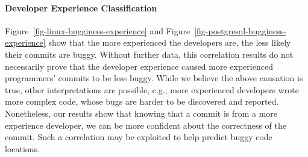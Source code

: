 


\paragraph{Developer Experience Classification}

Figure~\ref{fig-linux-bugginess-experience} and Figure~\ref{fig-postgresql-bugginess-experience} 
show that the more experienced the developers are, the less likely their commits are buggy.
Without further data, this correlation results do not necessarily prove that the developer experience caused more 
experienced programmers' commits to be less buggy. 
While we believe the above causation is true, other interpretations are possible, e.g., more experienced developers wrote 
more complex code, whose bugs are harder to be discovered and reported. 
Nonetheless, our results show that knowing that a commit is from a more experience developer, we can 
be more confident about the correctness of the commit. Such a correlation may be exploited 
to help predict buggy code locations.



